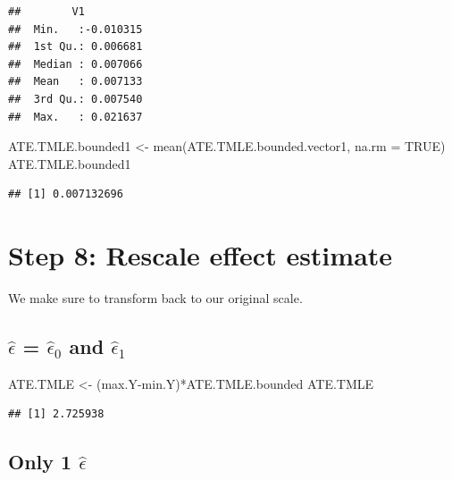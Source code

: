 \documentclass[
]{book}
\newenvironment{Shaded}{\begin{snugshade}}{\end{snugshade}}
\newcommand{\AttributeTok}[1]{\textcolor[rgb]{0.77,0.63,0.00}{#1}}
\newcommand{\ConstantTok}[1]{\textcolor[rgb]{0.00,0.00,0.00}{#1}}
\newcommand{\FunctionTok}[1]{\textcolor[rgb]{0.00,0.00,0.00}{#1}}
\newcommand{\NormalTok}[1]{#1}
\newcommand{\OtherTok}[1]{\textcolor[rgb]{0.56,0.35,0.01}{#1}}
\newcommand{\SpecialCharTok}[1]{\textcolor[rgb]{0.00,0.00,0.00}{#1}}
\begin{document}
\begin{verbatim}
##        V1           
##  Min.   :-0.010315  
##  1st Qu.: 0.006681  
##  Median : 0.007066  
##  Mean   : 0.007133  
##  3rd Qu.: 0.007540  
##  Max.   : 0.021637
\end{verbatim}

\begin{Shaded}
\begin{Highlighting}[]
\NormalTok{ATE.TMLE.bounded1 }\OtherTok{\textless{}{-}} \FunctionTok{mean}\NormalTok{(ATE.TMLE.bounded.vector1, }
                         \AttributeTok{na.rm =} \ConstantTok{TRUE}\NormalTok{) }
\NormalTok{ATE.TMLE.bounded1 }
\end{Highlighting}
\end{Shaded}

\begin{verbatim}
## [1] 0.007132696
\end{verbatim}

\hypertarget{step-8-rescale-effect-estimate}{%
\section{Step 8: Rescale effect estimate}\label{step-8-rescale-effect-estimate}}

We make sure to transform back to our original scale.

\hypertarget{hatepsilon-hatepsilon_0-and-hatepsilon_1-3}{%
\subsection{\texorpdfstring{\(\hat\epsilon\) = \(\hat\epsilon_0\) and \(\hat\epsilon_1\)}{\textbackslash hat\textbackslash epsilon = \textbackslash hat\textbackslash epsilon\_0 and \textbackslash hat\textbackslash epsilon\_1}}\label{hatepsilon-hatepsilon_0-and-hatepsilon_1-3}}

\begin{Shaded}
\begin{Highlighting}[]
\NormalTok{ATE.TMLE }\OtherTok{\textless{}{-}}\NormalTok{ (max.Y}\SpecialCharTok{{-}}\NormalTok{min.Y)}\SpecialCharTok{*}\NormalTok{ATE.TMLE.bounded   }
\NormalTok{ATE.TMLE }
\end{Highlighting}
\end{Shaded}

\begin{verbatim}
## [1] 2.725938
\end{verbatim}

\hypertarget{only-1-hatepsilon-3}{%
\subsection{\texorpdfstring{Only 1 \(\hat\epsilon\)}{Only 1 \textbackslash hat\textbackslash epsilon}}\label{only-1-hatepsilon-3}}
\end{document}
